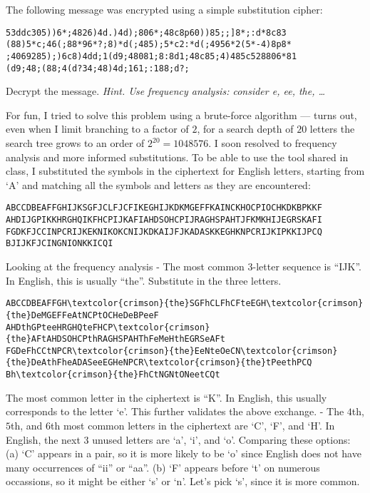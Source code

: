 
\begin{problem}
\noindent
The following message was encrypted using a simple substitution cipher:
\begin{verbatim}
53ddc305))6*;4826)4d.)4d);806*;48c8p60))85;;]8*;:d*8c83
(88)5*c;46(;88*96*?;8)*d(;485);5*c2:*d(;4956*2(5*-4)8p8*
;4069285);)6c8)4dd;1(d9;48081;8:8d1;48c85;4)485c528806*81
(d9;48;(88;4(d?34;48)4d;161;:188;d?;
\end{verbatim}
Decrypt the message.  \emph{Hint. Use frequency analysis: consider e,
ee, the, \ldots}
\end{problem}

\begin{Answer}
For fun, I tried to solve this problem using a brute-force algorithm --- turns out,
even when I limit branching to a factor of $2$, for a search depth of $20$ letters the search tree
grows to an order of $2^{20} = 1048576$.
\noindent
I soon resolved to frequency analysis and more informed substitutions.
To be able to use the tool shared in class, I substituted the symbols
in the ciphertext for English letters, starting from `A' and matching
all the symbols and letters as they are encountered:
\newline
\noindent

\color{blue}
\begin{verbatim}
ABCCDBEAFFGHIJKSGFJCLFJCFIKEGHIJKDKMGEFFKAINCKHOCPIOCHKDKBPKKF
AHDIJGPIKKHRGHQIKFHCPIJKAFIAHDSOHCPIJRAGHSPAHTJFKMKHIJEGRSKAFI
FGDKFJCCINPCRIJKEKNIKOKCNIJKDKAIJFJKADASKKEGHKNPCRIJKIPKKIJPCQ
BJIJKFJCINGNIONKKICQI
\end{verbatim}
\color{black}
Looking at the frequency analysis
\color{black}
- The most common 3-letter sequence is ``IJK''. In English, this is
usually ``the''. Substitute in the three letters.
\color{blue}
\begin{Verbatim}[commandchars=\\\{\}]
ABCCDBEAFFGH\textcolor{crimson}{the}SGFhCLFhCFteEGH\textcolor{crimson}{the}DeMGEFFeAtNCPtOCHeDeBPeeF
AHDthGPteeHRGHQteFHCP\textcolor{crimson}{the}AFtAHDSOHCPthRAGHSPAHThFeMeHthEGRSeAFt
FGDeFhCCtNPCR\textcolor{crimson}{the}EeNteOeCN\textcolor{crimson}{the}DeAthFheADASeeEGHeNPCR\textcolor{crimson}{the}tPeethPCQ
Bh\textcolor{crimson}{the}FhCtNGNtONeetCQt
\end{Verbatim}
\color{black}

\noindent
The most common letter in the ciphertext is ``K''. In English, this usually corresponds
to the letter `e'. This further validates the above exchange.
\newline
- The $4$th, $5$th, and $6$th most common letters in the ciphertext are
`C', `F', and `H'. In English, the next $3$ unused letters are
`a', `i', and `o'.
   Comparing these options: (a) `C' appears in a pair, so it is more likely to be `o'
   since English does not have many occurrences of ``ii'' or ``aa''. (b) `F' appears
   before `t' on numerous occassions, so it might be either `s' or `n'.
   Let's pick `s', since it is more common.


\end{Answer}
